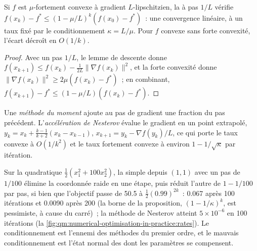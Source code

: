 \begin{proposition}\label{prop:qm:numerical-optimisation-in-practice:rates}
Si $f$ est $\mu$-fortement convexe à gradient $L$-lipschitzien, la  à pas $1/L$ vérifie $f(x_k) - f^* \le (1 - \mu/L)^k(f(x_0) - f^*)$~: une convergence linéaire, à un taux
fixé par le conditionnement $\kappa = L/\mu$. Pour $f$ convexe sans forte convexité, l'écart décroît en $O(1/k)$.
\end{proposition}

\begin{proof}
Avec un pas $1/L$, le lemme de descente donne $f(x_{k+1}) \le f(x_k) - \frac1{2L}\lVert\nabla f(x_k)\rVert^2$, et la forte convexité donne $\lVert\nabla f(x_k)\rVert^2 \ge 2\mu(f(x_k) -
f^*)$~; en combinant, $f(x_{k+1}) - f^* \le (1 - \mu/L)(f(x_k) - f^*)$.
\end{proof}

\begin{definition}\label{def:qm:numerical-optimisation-in-practice:momentum}
Une \emph{méthode du moment} ajoute au pas de gradient une fraction du pas précédent. L'\emph{accélération de Nesterov} évalue le
gradient en un point extrapolé, $y_k = x_k + \frac{k-1}{k+2}(x_k - x_{k-1})$, $x_{k+1} = y_k - \nabla f(y_k)/L$, ce qui porte le taux convexe à $O(1/k^2)$ et le taux fortement convexe
à environ $1 - 1/\sqrt\kappa$ par itération.
\end{definition}

Sur la quadratique $\frac12(x_1^2 + 100x_2^2)$, la  simple depuis $(1, 1)$ avec un pas de $1/100$ élimine la coordonnée raide en une étape, puis réduit l'autre de $1 - 1/100$ par
pas, si bien que l'objectif passe de 50.5 à $\frac12(0.99)^{2k}$~: 0.067 après 100 itérations et 0.0090 après 200 (la borne de la proposition, $(1 - 1/\kappa)^k$, est pessimiste, à cause du carré)~;
la méthode de Nesterov atteint $5 \times 10^{-6}$ en 100 itérations (la \cref{fig:qm:numerical-optimisation-in-practice:rates}).
Le conditionnement est l'ennemi des méthodes du premier ordre, et le mauvais conditionnement est l'état normal des  dont les paramètres se compensent.


